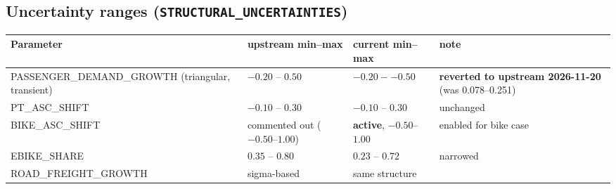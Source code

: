 \documentclass[10pt,a4paper]{article}
\begin{document}
\subsection{Uncertainty ranges (\texttt{STRUCTURAL\_UNCERTAINTIES})}
\begin{center}\small\begin{tabular}{@{}>{\RaggedRight\arraybackslash}p{4.8cm}>{\RaggedRight\arraybackslash}p{3.2cm}>{\RaggedRight\arraybackslash}p{3.2cm}>{\RaggedRight\arraybackslash}p{4.4cm}@{}}
\toprule
Parameter & upstream min--max & current min--max & note \\
\midrule
PASSENGER\_DEMAND\_GROWTH (triangular, transient) & $-0.20$ -- $0.50$ & $\mathbf{-0.20 -- 0.50}$ & \textbf{reverted to upstream 2026-11-20} (was 0.078--0.251) \\
PT\_ASC\_SHIFT & $-0.10$ -- $0.30$ & $-0.10$ -- $0.30$ & unchanged \\
BIKE\_ASC\_SHIFT & commented out ($-0.50$--$1.00$) & \textbf{active}, $-0.50$--$1.00$ & enabled for bike case \\
EBIKE\_SHARE & $0.35$ -- $0.80$ & $0.23$ -- $0.72$ & narrowed \\
ROAD\_FREIGHT\_GROWTH & sigma-based & same structure & \\
\bottomrule
\end{tabular}\end{center}
\end{document}
